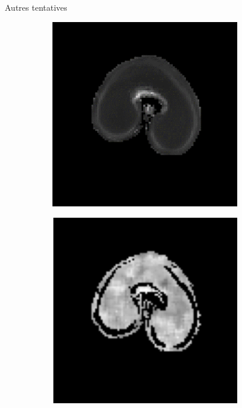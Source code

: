 \documentclass[10pt]{beamer}
\begin{document}
\begin{frame}{Autres tentatives}
    \begin{figure}[ht]
    \centering
    \begin{subfigure}[t]{0.31\textwidth}
      \centering
      \includegraphics[width=0.9\textwidth]{fig/mri_slice8_250}
      \caption{}
      \label{subfig:mri_slice8_250}
    \end{subfigure}%
    \begin{subfigure}[t]{0.31\textwidth}
      \centering
      \includegraphics[width=0.9\textwidth]{fig/cosine_kmeans}

\end{subfigure}
\end{figure}
\end{frame}
\end{document}
